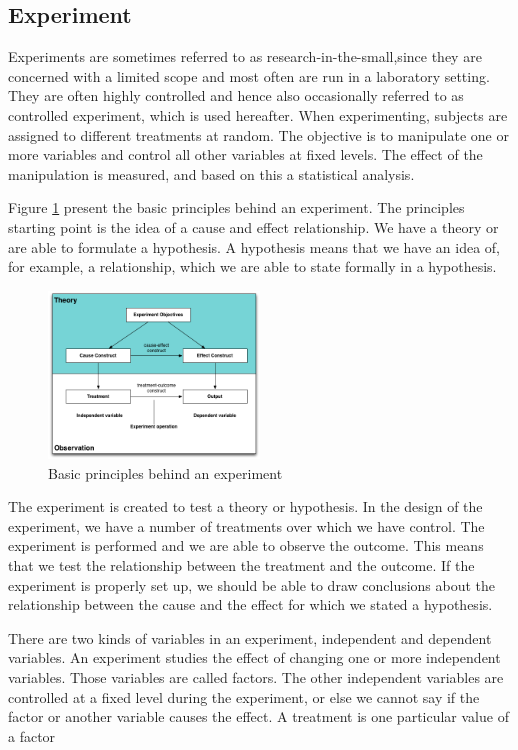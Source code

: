 \subsection{Experiment}

Experiments are sometimes referred to as research-in-the-small,since they are concerned with a limited scope and most often are run in a laboratory setting. They are often highly controlled and hence also occasionally referred to as controlled experiment, which is used hereafter. When experimenting, subjects are assigned to different treatments at random. The objective is to manipulate one or more variables and control all other variables at fixed levels.
The effect of the manipulation is measured, and based on this a statistical analysis. 

Figure \ref{fig:basic} present the basic principles behind an experiment. The principles starting point is the idea of a cause and effect relationship. We have a theory or are able to formulate a hypothesis. A hypothesis means that we have an idea of, for example, a relationship, which we are able to state formally in a hypothesis. 

\begin{figure}[h]
\center
\includegraphics[width=0.5\textwidth]{./images/experiment.png}
\caption{Basic principles behind an experiment}
\label{fig:basic}
\end{figure}

The experiment is created to test a theory or hypothesis. In the design of the experiment, we have a number of treatments over which we have control. The experiment is performed and we are able to observe the outcome. This means that we test the relationship between the treatment and the outcome. If the experiment is properly set up, we should be able to draw conclusions about the relationship between the cause and the effect for which we stated a hypothesis. 

There are two kinds of variables in an experiment, independent and dependent variables. An experiment studies the effect of changing one or more independent variables.
Those variables are called factors. The other independent variables are controlled at a fixed level during the experiment, or else we cannot say if the factor or another variable causes the effect. A treatment is one particular value of a factor

